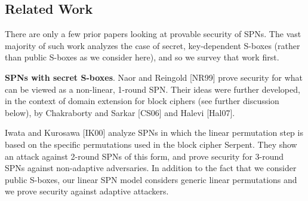 %
%
%
%
%
%
%
%
%
%
%
%
%
%
%
%






\subsection{Related Work}


There are only a few prior papers looking at provable security of SPNs. The vast
majority of such work analyzes the case of secret, key-dependent S-boxes (rather
than public S-boxes as we consider here), and so we survey that work first.



{\bf SPNs with secret S-boxes}. Naor and Reingold [NR99] prove security for
what can be viewed as a non-linear, 1-round SPN. Their ideas were further
developed, in the context of domain extension for block ciphers (see further
discussion below), by Chakraborty and Sarkar [CS06] and Halevi [Hal07].


Iwata and Kurosawa [IK00] analyze SPNs in which the linear permutation
step is based on the specific permutations used in the block cipher Serpent. They
show an attack against 2-round SPNs of this form, and prove security for 3-round
SPNs against non-adaptive adversaries. In addition to the fact that we consider
public S-boxes, our linear SPN model considers generic linear permutations and
we prove security against adaptive attackers.

